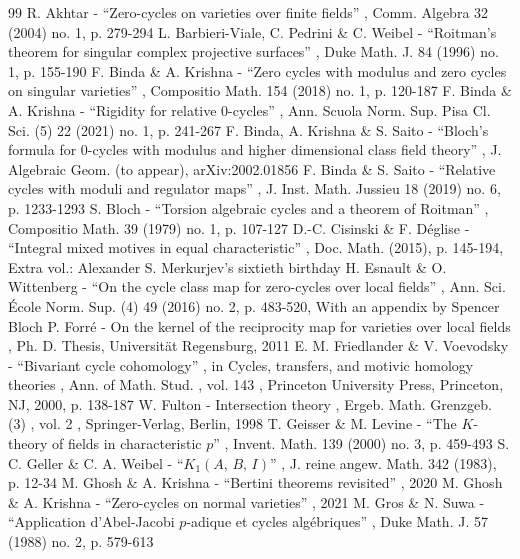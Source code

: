 \documentclass[11pt]{article}
\numberwithin{equation}{section}
\theoremstyle{definition}
\begin{document}

\begin{thebibliography}{99}
 R. Akhtar - “Zero-cycles on varieties over finite fields” , Comm. Algebra 32 (2004) no. 1, p. 279-294
 L. Barbieri-Viale, C. Pedrini \& C. Weibel - “Roitman’s theorem for singular complex projective surfaces” , Duke Math. J. 84 (1996) no. 1, p. 155-190
 F. Binda \& A. Krishna - “Zero cycles with modulus and zero cycles on singular varieties” , Compositio Math. 154 (2018) no. 1, p. 120-187
 F. Binda \& A. Krishna - “Rigidity for relative 0-cycles” , Ann. Scuola Norm. Sup. Pisa Cl. Sci. (5) 22 (2021) no. 1, p. 241-267
 F. Binda, A. Krishna \& S. Saito - “Bloch’s formula for $0$-cycles with modulus and higher dimensional class field theory” , J. Algebraic Geom. (to appear), arXiv:2002.01856
 F. Binda \& S. Saito - “Relative cycles with moduli and regulator maps” , J. Inst. Math. Jussieu 18 (2019) no. 6, p. 1233-1293
 S. Bloch - “Torsion algebraic cycles and a theorem of Roitman” , Compositio Math. 39 (1979) no. 1, p. 107-127
 D.-C. Cisinski \& F. Déglise - “Integral mixed motives in equal characteristic” , Doc. Math. (2015), p. 145-194, Extra vol.: Alexander S. Merkurjev’s sixtieth birthday
 H. Esnault \& O. Wittenberg - “On the cycle class map for zero-cycles over local fields” , Ann. Sci. École Norm. Sup. (4) 49 (2016) no. 2, p. 483-520, With an appendix by Spencer Bloch
 P. Forré - On the kernel of the reciprocity map for varieties over local fields , Ph. D. Thesis, Universität Regensburg, 2011
 E. M. Friedlander \& V. Voevodsky - “Bivariant cycle cohomology” , in Cycles, transfers, and motivic homology theories , Ann. of Math. Stud. , vol. 143 , Princeton University Press, Princeton, NJ, 2000, p. 138-187
 W. Fulton - Intersection theory , Ergeb. Math. Grenzgeb. (3) , vol. 2 , Springer-Verlag, Berlin, 1998
 T. Geisser \& M. Levine - “The $K$-theory of fields in characteristic $p$” , Invent. Math. 139 (2000) no. 3, p. 459-493
 S. C. Geller \& C. A. Weibel - “$K_{1}(A,\,B,\,I)$” , J. reine angew. Math. 342 (1983), p. 12-34
 M. Ghosh \& A. Krishna - “Bertini theorems revisited” , 2020
 M. Ghosh \& A. Krishna - “Zero-cycles on normal varieties” , 2021
 M. Gros \& N. Suwa - “Application d’Abel-Jacobi $p$-adique et cycles algébriques” , Duke Math. J. 57 (1988) no. 2, p. 579-613

\end{thebibliography}
\end{document}
